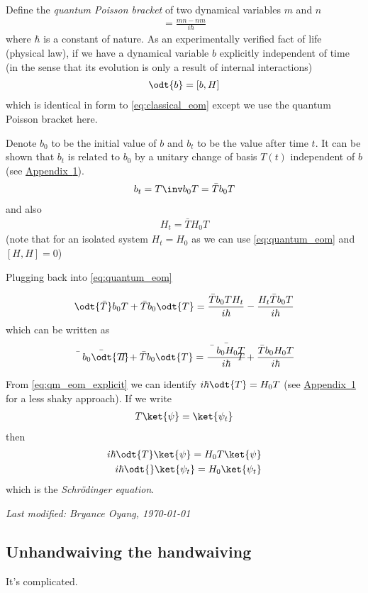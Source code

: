 \documentclass[12pt, oneside, letterpaper, fleqn]{article}
\begin{document}
Define the \emph{quantum Poisson bracket} of two dynamical variables $m$
and $n$
\begin{align}
[m, n] = \frac{mn - nm}{i\hbar}
\end{align}
where $\hbar$ is a constant of nature. As an experimentally verified
fact of life (physical law), if we have a dynamical variable $b$
explicitly independent of time (in the sense that its evolution is
only a result of internal interactions)
\begin{align}\label{eq:quantum_eom}
\odt{b} = [b, H]
\end{align}
which is identical in form to \autoref{eq:classical_eom} except we use
the quantum Poisson bracket here.

Denote $b_0$ to be the initial value of $b$ and $b_t$ to be the value
after time $t$. It can be shown that $b_t$ is related to $b_0$ by a
unitary change of basis $T(t)$ independent of $b$ (see
\hyperref[app:complicated]{Appendix~\ref*{app:complicated}}).
\begin{align}
b_t = T\inv b_0 T = \bar{T} b_0 T
\end{align}
and also
\begin{align}
H_t = \bar{T}H_0T
\end{align}
(note that for an isolated system $H_t = H_0$ as we can use
\autoref{eq:quantum_eom} and $[H, H] = 0$)

Plugging back into \autoref{eq:quantum_eom}

\begin{align*}
\odt{\bar{T}} b_0 T + \bar{T} b_0 \odt{T}
= \frac{\bar{T}b_0TH_t}{i\hbar} - \frac{H_t\bar{T}b_0T}{i\hbar}\\
\end{align*}
which can be written as
\begin{align}\label{eq:qm_eom_explicit}
\bar{\bar{T} b_0 \odt{T}}+ \bar{T} b_0 \odt{T}
= \bar{\frac{\bar{T}b_0H_0T}{i\hbar}} +
\frac{\bar{T}b_0H_0T}{i\hbar} 
\end{align}

From \autoref{eq:qm_eom_explicit} we can identify $i\hbar \odt{T} =
H_0T$ (see \hyperref[app:complicated]{Appendix~\ref*{app:complicated}}
for a less shaky approach). If we write
\begin{align}
T\ket{\psi} = \ket{\psi_t}
\end{align}
then
\begin{align}
i\hbar \odt{T} \ket{\psi} = H_0T\ket{\psi}\nonumber\\
i\hbar \odt{}\ket{\psi_t} = H_0\ket{\psi_t}
\end{align}
which is the \emph{Schr\"odinger equation}.

\hfill \emph{Last modified: Bryance Oyang, \today}

\begin{appendices}
\section{Unhandwaiving the handwaiving}\label{app:complicated}
It's complicated.
\end{appendices}
\end{document}
